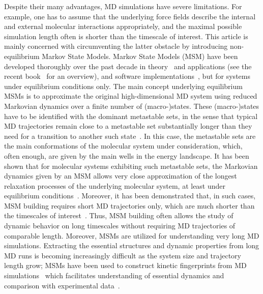\documentclass[journal=jctcce,manuscript=article]{achemso}
\begin{document}
Despite their many advantages, MD simulations have severe limitations. For example, one has to assume that the underlying force fields  describe the internal and external molecular interactions appropriately, and the maximal possible simulation length often is shorter than the timescale of interest. 
This article is mainly concerned with circumventing the latter obstacle by introducing non-equilibrium Markov State Models. Markov State Models
(MSM) have been  developed thoroughly over the
past decade in theory~\cite{A19-31,prinz2011markov} and applications (see the recent book~\cite{A19-1} for an overview), and software implementations~\cite{A19-49, MSMBuilder}, but for systems under equilibrium conditions only.
The main concept underlying equilibrium MSMs is to approximate the original high-dimensional MD system 
using reduced Markovian dynamics over a finite number of (macro-)states. These (macro-)states
have to be identified with the dominant metastable sets, in the sense that
typical MD trajectories remain close to a metastable set substantially longer than
they need for a transition to another such state~\cite{A19-31,schuette2011markov}. In this case, the metastable sets are the main conformations of the molecular system under consideration, which, often enough, are given by the main wells in the energy landscape. 
It has been shown that for molecular systems exhibiting such metastable sets, the Markovian dynamics given by an MSM allows very close approximation of the longest relaxation processes of the underlying molecular system, at least under equilibrium conditions~\cite{sarich2010approximation,Eigenvalues}. 
Moreover, it has been demonstrated that, in such cases, MSM building requires short MD trajectories only, which are much shorter than the timescales of interest~\cite{PNAS09,kohlhoff2014cloud}.  
Thus, MSM building often allows the study of dynamic behavior on long timescales without requiring MD trajectories of comparable length.
Moreover, MSMs are utilized for understanding very long MD simulations. Extracting the essential structures and dynamic properties from long MD runs is
becoming increasingly difficult as the system size and trajectory length grow; MSMs have been used to construct kinetic fingerprints from MD simulations~\cite{A19-39} which facilitates understanding of essential dynamics and comparison with experimental data~\cite{PrinzKellerNoe_PCCP11_Perspective}.


\end{document}
